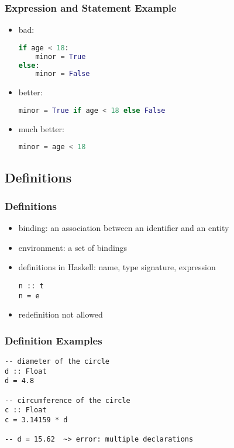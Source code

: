 \documentclass[dvipsnames]{beamer}
\theoremstyle{plain}
\begin{document}
\begin{frame}[fragile]
  \frametitle{Expression and Statement Example}

  \begin{itemize}
    \item bad:
    \begin{lstlisting}[language=Python, morekeywords={True, False}]
if age < 18:
    minor = True
else:
    minor = False
    \end{lstlisting}

    \pause
    \medskip
    \item better:
    \begin{lstlisting}[language=Python, morekeywords={True, False}]
minor = True if age < 18 else False
    \end{lstlisting}

    \pause
    \medskip
    \item much better:
    \begin{lstlisting}[language=Python]
minor = age < 18
    \end{lstlisting}
  \end{itemize}
\end{frame}

\subsection{Definitions}

\begin{frame}[fragile]
  \frametitle{Definitions}

  \begin{itemize}
    \item \alert{binding}: an association between an identifier and an entity
    \item \alert{environment}: a set of bindings

    \pause
    \bigskip
    \item definitions in Haskell: name, type signature, expression
    \begin{lstlisting}[style=syntax]
n :: t
n = e
    \end{lstlisting}

    \medskip
    \item redefinition not allowed
  \end{itemize}
\end{frame}

\begin{frame}[fragile]
  \frametitle{Definition Examples}

  \begin{lstlisting}
-- diameter of the circle
d :: Float
d = 4.8

-- circumference of the circle
c :: Float
c = 3.14159 * d

-- d = 15.62  ~> error: multiple declarations
  \end{lstlisting}
\end{frame}
\end{document}
